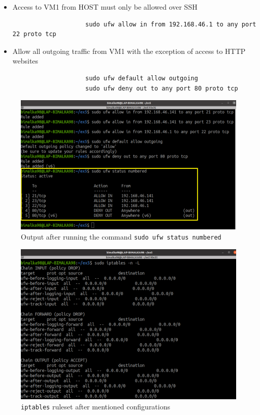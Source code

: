 \documentclass[11pt,letterpaper]{article}
\newenvironment{answer}{\em \color{blue} \begin{adjustwidth}{1cm}{1cm}}{\end{adjustwidth}}
\begin{document}
\begin{enumerate}
\begin{answer}
\begin{itemize}
				\item Access to VM1 from HOST must only be allowed over SSH
				
				\begin{verbatim}
					sudo ufw allow in from 192.168.46.1 to any port 22 proto tcp
				\end{verbatim}
				
				\item Allow all outgoing traffic from VM1 with the exception of access to HTTP websites
				
				\begin{verbatim}
					sudo ufw default allow outgoing					
					sudo ufw deny out to any port 80 proto tcp
				\end{verbatim}
			\end{itemize}
		
		
			\begin{figure}[H]
				\centering
				\includegraphics[width=0.75\columnwidth]{images/part2/4.png}
				\caption{Output after running the command \texttt{sudo ufw status numbered}}
			\end{figure}
		
			\begin{figure}[H]
				\centering
				\includegraphics[width=0.75\columnwidth]{images/part2/5.png}
				\caption{{\tt iptables} ruleset after mentioned configurations}
			\end{figure}
		

\end{answer}
\end{enumerate}
\end{document}
